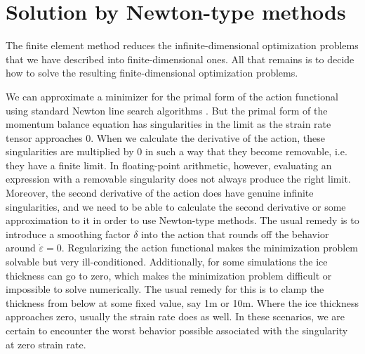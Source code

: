 \documentclass{article}
\theoremstyle{definition}
\theoremstyle{plain}
\begin{document}
\section{Solution by Newton-type methods}
\label{app:solution}

The finite element method reduces the infinite-dimensional optimization problems that we have described into finite-dimensional ones.
All that remains is to decide how to solve the resulting finite-dimensional optimization problems.

We can approximate a minimizer for the primal form of the action functional using standard Newton line search algorithms \citep{shapero2021icepack}.
But the primal form of the momentum balance equation has singularities in the limit as the strain rate tensor approaches 0.
When we calculate the derivative of the action, these singularities are multiplied by 0 in such a way that they become removable, i.e. they have a finite limit.
In floating-point arithmetic, however, evaluating an expression with a removable singularity does not always produce the right limit.
Moreover, the second derivative of the action does have genuine infinite singularities, and we need to be able to calculate the second derivative or some approximation to it in order to use Newton-type methods.
The usual remedy is to introduce a smoothing factor $\delta$ into the action that rounds off the behavior around $\dot\varepsilon = 0$.
Regularizing the action functional makes the minimization problem solvable but very ill-conditioned.
Additionally, for some simulations the ice thickness can go to zero, which makes the minimization problem difficult or impossible to solve numerically.
The usual remedy for this is to clamp the thickness from below at some fixed value, say 1m or 10m.
Where the ice thickness approaches zero, usually the strain rate does as well.
In these scenarios, we are certain to encounter the worst behavior possible associated with the singularity at zero strain rate.
\end{document}
